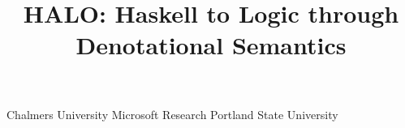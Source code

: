 \documentclass[preprint,nocopyrightspace,draft]{sigplanconf}
\begin{document}
 

\newcommand{\Ct}{{\tt C}}
\newcommand{\CF}{{\tt CF}}
\newcommand{\True}{\mathop{True}}
\newcommand{\False}{\mathop{False}}
\newcommand{\Bool}{\mathop{Bool}}
\newcommand{\ys}{\ol{y}}
\newcommand{\Th}[2]{{\cal T}_{#1,#2}}
\newcommand{\Ecf}{\textsc{Ecf}}
\newcommand{\oln}[2]{\ol{#1}^{#2}}
\newcommand{\tmar}[2]{\mathop{tmar}_{#1}(#2)}
\newcommand{\tyar}[2]{\mathop{tyar}_{#1}(#2)}
\newcommand{\ar}{n}
\newcommand{\lcf}[1]{\textsf{cf}(#1)}
\newcommand{\lcfZ}{\textsf{cf}}
\newcommand{\lncf}[1]{\neg\textsf{cf}(#1)}
\newcommand{\unr}{\mathop{unr}}
\newcommand{\bad}{\mathop{bad}}
\newcommand{\sel}[2]{\mathop{sel\_#1\!\_#2}}
\newcommand{\ctrans}[3]{{\cal C}\{\!\!\{#3\}\!\!\}_{#2}^{#1}}
\newcommand{\etrans}[3]{{\cal E}\{\!\!\{#3\}\!\!\}_{#2}^{#1}}
\newcommand{\utrans}[3]{{\cal U}\{\!\!\{#3\}\!\!\}_{#2}^{#1}}
\newcommand{\dtrans}[2]{{\cal D}\{\!\!\{#2\}\!\!\}^{#1}}
\newcommand{\Dtrans}[2]{{\cal D}\{\!\!\{#2\}\!\!\}^{#1}}
\newcommand{\roll}{\mathsf{roll}}
\newcommand{\unroll}{\mathsf{unroll}}
\newcommand{\bind}{\mathsf{bind}}
\newcommand{\ret}{\mathsf{ret}}
\newcommand{\dlambda}{\mathsf{\lambda}}
\newcommand{\curry}{\mathsf{curry}}
\newcommand{\eval}{\mathsf{eval}}
\newcommand{\uncurry}{\mathsf{incurry}}
\newcommand{\dapp}{\mathsf{app}}
\newcommand{\inj}[1]{\mathsf{inj}_{#1}}
\newcommand{\unitcpo}{{\sf{\bf 1}}}
\newcommand{\VarCpo}{\textit{Var}}
\newcommand{\FVarCpo}{\textit{FunVar}}
\newcommand{\interp}[3]{[\![#1]\!]_{\langle {#2},{#3}\rangle}}
\newcommand{\dbrace}[1]{[\![#1]\!]}
\newcommand{\linterp}[1]{{\cal I}(#1)}
\newcommand{\lassign}[1]{\mu(#1)}
\newcommand{\elab}[1]{\rightsquigarrow \formula{#1}}
\newcommand{\Fcf}{F_{\lcfZ}} 
\newcommand{\definable}[1]{{\mathop{def}}(#1)}
\newcommand{\curly}{\rightsquigarrow}
\newcommand{\Min}{\cal M}
\newcommand{\mlinterp}[1]{{\cal I}^\mu(#1)}

\title{HALO: Haskell to Logic through Denotational Semantics}

           {Chalmers University}{}
           {Microsoft Research}{}
           {Portland State University}{}
\maketitle
\makeatactive
\end{document}
